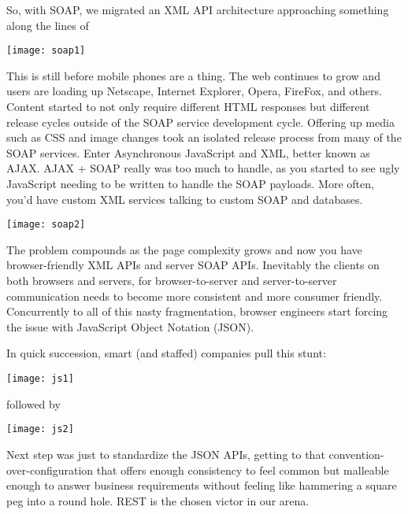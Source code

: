 \begin{minipage}{\linewidth}
So, with SOAP, we migrated an XML API architecture approaching something along the lines of

\texttt{[image: soap1]}

\end{minipage}

This is still before mobile phones are a thing.  The web continues to grow and users are loading up Netscape, Internet Explorer, Opera, FireFox, and others.  Content started to not only require different HTML responses but different release cycles outside of the SOAP service development cycle.  Offering up media such as CSS and image changes took an isolated release process from many of the SOAP services.  Enter Asynchronous JavaScript and XML, better known as AJAX.  AJAX + SOAP really was too much to handle, as you started to see ugly JavaScript needing to be written to handle the SOAP payloads.  More often, you'd have custom XML services talking to custom SOAP and databases.

\texttt{[image: soap2]}

The problem compounds as the page complexity grows and now you have browser-friendly XML APIs and server SOAP APIs.  Inevitably the clients on both browsers and servers, for browser-to-server and server-to-server communication needs to become more consistent and more consumer friendly.  Concurrently to all of this nasty fragmentation, browser engineers start forcing the issue with JavaScript Object Notation (JSON).


\begin{minipage}{\linewidth}

In quick succession, smart (and staffed) companies pull this stunt:

\texttt{[image: js1]}

\end{minipage}

\begin{minipage}{\linewidth}

followed by

\texttt{[image: js2]}

\end{minipage}

Next step was just to standardize the JSON APIs, getting to that convention-over-configuration that offers enough consistency to feel common but malleable enough to answer business requirements without feeling like hammering a square peg into a round hole.  REST is the chosen victor in our arena.

